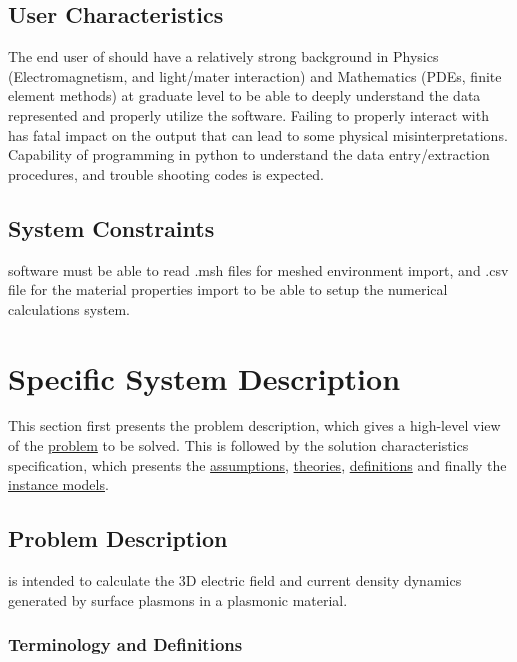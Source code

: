 \documentclass[12pt]{article}
\begin{document}
	\subsection{User Characteristics} \label{SecUserCharacteristics} The end user
	of \progname{} should have a relatively strong background in  Physics
	(Electromagnetism, and light/mater interaction) and Mathematics (PDEs, finite
	element methods) at graduate level to be able to deeply understand the data
	represented and properly utilize the software. Failing to properly interact
	with \progname{} has fatal impact on the output that can lead to some physical
	misinterpretations. Capability of programming in python to understand the data
	entry/extraction procedures, and trouble shooting codes is expected.
	
	
	
	
	\subsection{System Constraints} \progname software must be able to read .msh
	files for meshed environment import, and .csv file for the material properties
	import to be able to setup the numerical calculations system.
	
	\section{Specific System Description}
	
	This section first presents the problem description, which gives a high-level
	view of the \hyperref[Sec_pd]{problem} to be solved. This is followed by the
	solution characteristics specification, which presents the
	\hyperref[sec_assumpt]{assumptions}, \hyperref[sec_theoretical]{theories},
	\hyperref[sec_datadef]{definitions} and finally the
	\hyperref[sec_instance]{instance models}.
	
	\subsection{Problem Description} \label{Sec_pd}
	
	\progname{} is intended to calculate the 3D electric field and current density
	dynamics generated by surface plasmons in a plasmonic material.
	
	\subsubsection{Terminology and  Definitions}
	
\end{document}
